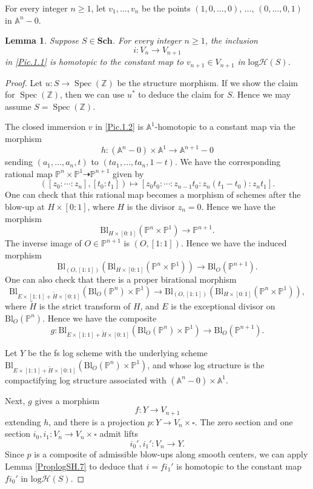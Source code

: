 \documentclass[11pt, a4paper]{amsart}
\newtheorem{lem}[thm]{Lemma}
\theoremstyle{definition}
\numberwithin{equation}{subsection}
\newcommand{\Z}{\mathbb{Z}}
\renewcommand{\P}{\mathbb{P}}
\newcommand{\A}{\mathbb{A}}
\newcommand{\Sch}{\mathbf{Sch}}
\providecommand{\Spec}[1]{\operatorname{Spec}(#1)} 	%
\newcommand{\Blow}{{\mathrm{Bl}}}
\newcommand{\boxx}{\square}
\newcommand{\cptsph}[1]{V_{#1}}
\newcommand{\inflogH}{\mathrm{log}\mathcal{H}}
\begin{document}
For every integer $n\geq 1$, let $v_1,\ldots,v_n$ be the points $(1,0,\ldots,0)$, $\ldots$, $(0,\ldots,0,1)$ in $\A^n-0$.

\begin{lem}
\label{Pic.3}
Suppose $S\in \Sch$.
For every integer $n\geq 1$, the inclusion
\[
i\colon \cptsph{n} \rightarrow \cptsph{n+1}
\]
in \eqref{Pic.1.1} is homotopic to the constant map to $v_{n+1}\in V_{n+1}$ in $\inflogH(S)$.
\end{lem}
\begin{proof}
Let $u\colon S\to \Spec{\Z}$ be the structure morphism.
If we show the claim for $\Spec{\Z}$, then we can use $u^*$ to deduce the claim for $S$.
Hence we may assume $S=\Spec{\Z}$.

The closed immersion $v$ in \eqref{Pic.1.2} is $\A^1$-homotopic to a constant map via the morphism
\[
h\colon (\A^n-0)\times \A^1\to \A^{n+1}-0
\]
sending $(a_1,\ldots,a_n,t)$ to $(ta_1,\ldots,ta_{n},1-t)$.
We have the corresponding rational map $\P^n\times \P^1\dashrightarrow \P^{n+1}$ given by
\[
([z_0:\cdots:z_n],[t_0:t_1])
\mapsto 
[z_0 t_0:\cdots:z_{n-1} t_0:z_n(t_1-t_0):z_n t_1].
\]
One can check that this rational map becomes a morphism of schemes after the blow-up at $H\times [0:1]$,
where $H$ is the divisor $z_n=0$.
Hence we have the morphism
\[
\Blow_{H\times [0:1]}(\P^n \times \P^1)
\to
\P^{n+1}.
\]
The inverse image of $O\in \P^{n+1}$ is $(O,[1:1])$.
Hence we have the induced morphism
\[
\Blow_{(O,[1:1])}(\Blow_{H\times [0:1]}(\P^n \times \P^1))
\to
\Blow_O (\P^{n+1}).
\]
One can also check that there is a proper birational morphism
\[
\Blow_{E\times [1:1]+\widetilde{H}\times [0:1]}(\Blow_O(\P^n)\times \P^1)
\to
\Blow_{(O,[1:1])}(\Blow_{H\times [0:1]}(\P^n \times \P^1)),
\]
where $\widetilde{H}$ is the strict transform of $H$,
and $E$ is the exceptional divisor on $\Blow_O(\P^n)$.
Hence we have the composite
\[
g\colon
\Blow_{E\times [1:1]+\widetilde{H}\times [0:1]}(\Blow_O(\P^n)\times \P^1)
\to
\Blow_O(\P^{n+1}).
\]


Let $Y$ be the fs log scheme with the underlying scheme 
$\Blow_{E\times [1:1]+\widetilde{H}\times [0:1]}(\Blow_O(\P^n)\times \P^1)$, 
and whose log structure is the compactifying log structure associated with $(\A^n-0)\times \A^1$.

Next, $g$ gives a morphism
\[
f\colon Y\to \cptsph{n+1}
\]
extending $h$, and there is a projection $p\colon Y\to  \cptsph{n}\times \boxx$.
The zero section and one section $i_0,i_1\colon  \cptsph{n}\to  \cptsph{n}\times \boxx$ admit lifts
\[
i_0',i_1'\colon  \cptsph{n}\to Y.
\]
Since $p$ is a composite of admissible blow-ups along smooth centers, 
we can apply Lemma \ref{ProplogSH.7} to deduce that $i=fi_1'$ is homotopic to the constant map 
$fi_0'$ in $\inflogH(S)$.
\end{proof}
\end{document}
